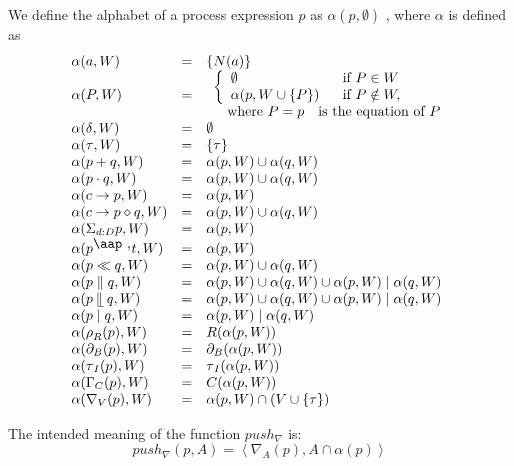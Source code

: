 \documentclass{article}
\begin{document}
We define the alphabet of a process expression $p$ as $\alpha (p,\emptyset )$%
, where $\alpha $ is defined as%
\[
\begin{array}{lll}
\alpha (a,W) & = & \{N(a)\} \\ 
\alpha (P,W) & = & 
\begin{array}{l}
\left\{ 
\begin{array}{ll}
\emptyset & \text{if }P\in W \\ 
\alpha (p,W\cup \{P\}) & \text{if }P\notin W,%
\end{array}%
\right. \\ 
\text{ where }P=p\text{ is the equation of }P%
\end{array}
\\ 
\alpha (\delta ,W) & = & \emptyset \\ 
\alpha (\tau ,W) & = & \{\tau \} \\ 
\alpha (p+q,W) & = & \alpha (p,W)\cup \alpha (q,W) \\ 
\alpha (p\cdot q,W) & = & \alpha (p,W)\cup \alpha (q,W) \\ 
\alpha (c\rightarrow p,W) & = & \alpha (p,W) \\ 
\alpha (c\rightarrow p\diamond q,W) & = & \alpha (p,W)\cup \alpha (q,W) \\ 
\alpha (\Sigma _{d:D}p,W) & = & \alpha (p,W) \\ 
\alpha (p^{\mathbin{\mbox{\aap
,}}}t,W) & = & \alpha (p,W) \\ 
\alpha (p\ll q,W) & = & \alpha (p,W)\cup \alpha (q,W) \\ 
\alpha (p\parallel q,W) & = & \alpha (p,W)\cup \alpha (q,W)\cup \alpha
(p,W)\mid \alpha (q,W) \\ 
\alpha (p\mathbin{\mathrel{\llfloor}}q,W) & = & \alpha (p,W)\cup \alpha
(q,W)\cup \alpha (p,W)\mid \alpha (q,W) \\ 
\alpha (p\mid q,W) & = & \alpha (p,W)\mid \alpha (q,W) \\ 
\alpha (\rho _{R}(p),W) & = & R(\alpha (p,W)) \\ 
\alpha (\partial _{B}(p),W) & = & \partial _{B}(\alpha (p,W)) \\ 
\alpha (\tau _{I}(p),W) & = & \tau _{I}(\alpha (p,W)) \\ 
\alpha (\Gamma _{C}(p),W) & = & C(\alpha (p,W)) \\ 
\alpha (\nabla _{V}(p),W) & = & \alpha (p,W)\cap (V\cup \{\tau \})%
\end{array}%
\]

The intended meaning of the function $push_{\nabla }$ is:%
\[
push_{\nabla }(p,A)=\left\langle \nabla _{A}(p),A\cap \alpha
(p)\right\rangle 
\]
\end{document}
